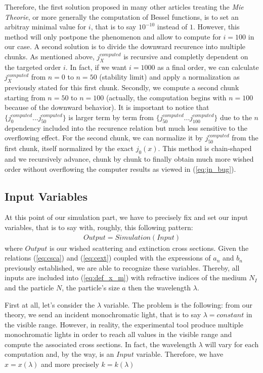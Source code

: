 \documentclass{article}
\numberwithin{equation}{section}
\begin{document}
Therefore, the first solution proposed in many other articles treating the \textit{Mie Theorie}, or more generally the computation of Bessel functions, is to set an arbitray minimal value for $i$, that is to say $10^{-10}$ instead of $1$. However, this method will only postpone the phenomenon and allow to compute for $i=100$ in our case. A second solution is to divide the downward recurence into multiple chunks. As mentioned above, $j^{computed}_{X}$ is recursive and completly dependent on the targeted order $i$. In fact, if we want $i=1000$ as a final order, we can calculate $j^{computed}_{X}$ from $n=0$ to $n=50$ (stability limit) and apply a normalization as previously stated for this first chunk. Secondly, we compute a second chunk starting from $n=50$ to $n=100$ (actually, the computation begins with $n=100$ because of the downward behavior). It is important to notice that $\{j^{computed}_{0}...j^{computed}_{50}\}$ is larger term by term from $\{j^{computed}_{50}...j^{computed}_{100}\}$ due to the $n$ dependency included into the recurence relation but much less sensitive to the overflowing effect. For the second chunk, we can normalize it by $j^{computed}_{50}$ from the first chunk, itself normalized by the exact $j_{0}(x)$. This method is chain-shaped and we recursively advance, chunk by chunk to finally obtain much more wished order without overflowing the computer results as viewed in (\ref{eq:jn_bug}).

\subsection{Input Variables}

At this point of our simulation part, we have to precisely fix and set our input variables, that is to say with, roughly, this following pattern:
\begin{align}
Output = Simulation(Input)
\end{align}
where $Output$ is our wished scattering and extinction cross sections. Given the relations (\ref{eq:csca}) and (\ref{eq:cext}) coupled with the expressions of $a_{n}$ and $b_{n}$ previously established, we are able to recognize these variables. Thereby, all inputs are included into (\ref{eq:def_x_m}) with refractive indices of the medium $N_{I}$ and the particle $N$, the particle's size $a$ then the wavelength $\lambda$.

First at all, let's consider the $\lambda$ variable. The problem is the following: from our theory, we send an incident monochromatic light, that is to say $\lambda=constant$ in the visible range. However, in reality, the experimental tool produce multiple monochromatic lights in order to reach all values in the visible range and compute the associated cross sections. In fact, the wavelength $\lambda$ will vary for each computation and, by the way, is an $Input$ variable. Therefore, we have $x=x(\lambda)$ and more precisely $k=k(\lambda)$
\end{document}
